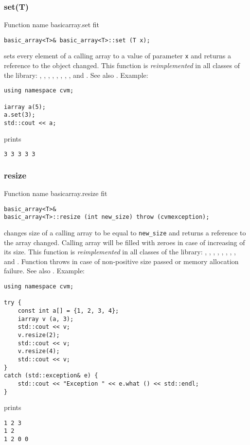\subsubsection{set(T)}
Function%
\pdfdest name {basicarray.set} fit
\begin{verbatim}
basic_array<T>& basic_array<T>::set (T x);
\end{verbatim}
sets every element of a calling array to a value of
parameter \verb"x"
and returns a reference to the object changed.
This function is \emph{reimplemented} in all classes of the library:
,  ,
,   ,
, ,
, ,
 and .
See also .
Example:
\begin{Verbatim}
using namespace cvm;

iarray a(5);
a.set(3);
std::cout << a;
\end{Verbatim}
prints
\begin{Verbatim}
3 3 3 3 3
\end{Verbatim}
\newpage


\subsubsection{resize}
Function%
\pdfdest name {basicarray.resize} fit
\begin{verbatim}
basic_array<T>&
basic_array<T>::resize (int new_size) throw (cvmexception);
\end{verbatim}
changes  size of a calling array to be equal to
\verb"new_size" and returns a reference to
the array changed. Calling array
will be filled with zeroes in case of increasing of its size.
This function is \emph{reimplemented} in all classes of the library:
,  ,
,   ,
, ,
, ,
 and .
Function throws 
in case of non-positive size passed or memory allocation failure.
See also .
Example:
\begin{Verbatim}
using namespace cvm;

try {
    const int a[] = {1, 2, 3, 4};
    iarray v (a, 3);
    std::cout << v;
    v.resize(2);
    std::cout << v;
    v.resize(4);
    std::cout << v;
}
catch (std::exception& e) {
    std::cout << "Exception " << e.what () << std::endl;
}
\end{Verbatim}
prints
\begin{Verbatim}
1 2 3
1 2
1 2 0 0
\end{Verbatim}
\newpage



